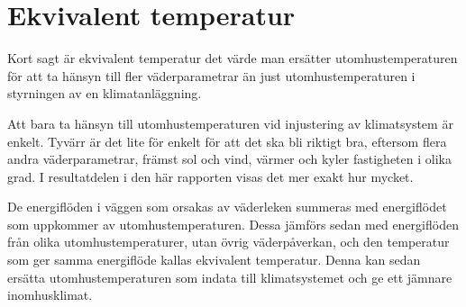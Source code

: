 \section{Ekvivalent temperatur}

Kort sagt är ekvivalent temperatur det värde man ersätter utomhustemperaturen för att ta 
hänsyn till fler väderparametrar än just utomhustemperaturen i styrningen av en 
klimatanläggning.

Att bara ta hänsyn till utomhustemperaturen vid injustering av klimatsystem är enkelt. 
Tyvärr är det lite för enkelt för att det ska bli riktigt bra, eftersom flera andra 
väderparametrar, främst sol och vind, värmer och kyler fastigheten i olika grad. I resultatdelen i den här rapporten visas det mer exakt hur mycket.

De energiflöden i väggen som orsakas av väderleken summeras med energiflödet 
som uppkommer av utomhustemperaturen. Dessa jämförs sedan med energiflöden från 
olika utomhustemperaturer, utan övrig väderpåverkan, och den temperatur som ger 
samma energiflöde kallas ekvivalent temperatur. Denna kan sedan ersätta 
utomhustemperaturen som indata till klimatsystemet och ge ett jämnare inomhusklimat.



